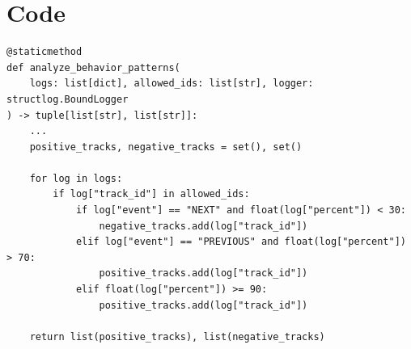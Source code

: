 \documentclass{pwrReport}
\begin{document}
    \section{Code}
\begin{lstlisting}
@staticmethod
def analyze_behavior_patterns(
    logs: list[dict], allowed_ids: list[str], logger: structlog.BoundLogger
) -> tuple[list[str], list[str]]:
    ...
    positive_tracks, negative_tracks = set(), set()

    for log in logs:
        if log["track_id"] in allowed_ids:
            if log["event"] == "NEXT" and float(log["percent"]) < 30:
                negative_tracks.add(log["track_id"])
            elif log["event"] == "PREVIOUS" and float(log["percent"]) > 70:
                positive_tracks.add(log["track_id"])
            elif float(log["percent"]) >= 90:
                positive_tracks.add(log["track_id"])

    return list(positive_tracks), list(negative_tracks)
\end{lstlisting}

    


\end{document}
